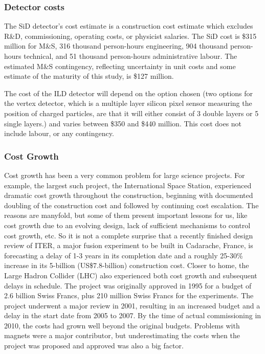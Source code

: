 \subsubsection{Detector costs}

The SiD detector’s cost estimate is a construction cost estimate which excludes R\&D, commissioning, operating costs, or physicist salaries. The SiD cost is \$315 million for M\&S, 316 thousand person-hours engineering, 904 thousand person-hours technical, and 51 thousand person-hours administrative labour. The estimated M\&S contingency, reflecting uncertainty in unit costs and some estimate of the maturity of this study, is \$127 million.

The cost of the ILD detector will depend on the option chosen (two options for the vertex detector, which is a multiple layer silicon pixel sensor measuring the position of charged particles, are that it will either consist of 3 double layers or 5 single layers.) and varies between \$350 and \$440 million. This cost does not include labour, or any contingency.
 
\subsubsection{Cost Growth}

Cost growth has been a very common problem for large science projects. For example, the largest such project, the International Space Station, experienced dramatic cost growth throughout the construction, beginning with documented doubling of the construction cost and followed by continuing cost escalation. The reasons are manyfold, but some of them present important lessons for us, like cost growth due to an evolving design, lack of sufficient mechanisms to control cost growth, etc. So it is not a complete surprise that a recently finished design review of ITER, a major fusion experiment to be built in Cadarache, France, is forecasting a delay of 1-3 years in its completion date and a roughly 25-30\% increase in its 5-billion (US\$7.8-billion) construction cost. Closer to home, the Large Hadron Collider (LHC) also experienced both cost growth and subsequent delays in schedule. The project was originally approved in 1995 for a budget of 2.6 billion Swiss Francs, plus 210 million Swiss Francs for the experiments. The project underwent a major review in 2001, resulting in an increased budget and a delay in the start date from 2005 to 2007. By the time of actual commissioning in 2010, the costs had grown well beyond the original budgets. Problems with magnets were a major contributor, but underestimating the costs when the project was proposed and approved was also a big factor. \cite{ILC:CostMegaprojects}
  
